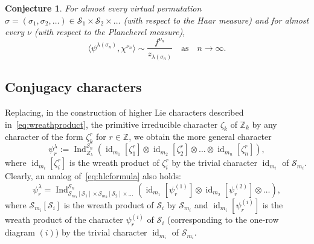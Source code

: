 \documentclass[12pt]%
{amsart}
\newcommand{\bbz}{\mathbb{Z}}
\renewcommand\S{{\mathcal S}}
\newcommand{\la}{{\lambda}}
\newcommand{\si}{{\sigma}}
\newcommand{\Ind}{\operatorname{Ind}}
\def\magenta#1{{\color{magenta}{#1}}}
\theoremstyle{plain}
\newtheorem{conjecture}[theorem]{Conjecture}
\theoremstyle{definition}
\theoremstyle{remark}
\newcommand{\id}{{\operatorname{id}}}
\newcommand{\todo}[1]{\vspace{5 mm}\par \noindent
	\marginpar{\textsc{ToDo}} \framebox{\begin{minipage}[c]{0.95
				\textwidth}
			#1 \end{minipage}}\vspace{5 mm}\par}
\begin{document}
\begin{conjecture}\label{conj:virtual}
    For almost every virtual permutation $\si =(\si_1,\si_2,\ldots) \in \S_1\times\S_2\times\ldots$ (with respect to the Haar measure) and for almost every $\nu$ (with respect to the Plancherel measure), 
    \[
        \langle \psi^{\la(\si_n)},\chi^{\nu_n} \rangle
        \sim \frac{f^{\nu_n}}{z_{\la(\si_n)}} 
        \quad \text{as} \quad n \to \infty .
    \]
\end{conjecture}



    


\subsection{Conjugacy characters}\label{sec:conjugacy}

Replacing, in the construction of higher Lie characters described in~\eqref{eq:wreathproduct}, the primitive irreducible character 
$\zeta_k$ of $\bbz_k$ by any character of the form $\zeta_k^r$ for $r \in \bbz$,
we obtain the more general character 
\[
    \psi^\la_r:=\Ind_{Z_\la}^{\S_n}\left(\id_{m_1}[\zeta_1^r]\otimes\id_{m_2}[\zeta_2^r]\otimes\ldots\otimes\id_{m_n}[\zeta_n^r]\right),
\]
where $\id_{m_i}[\zeta_i^r]$ is the wreath product of $\zeta_i^r$ by the trivial character $\id_{m_i}$ of $\S_{m_i}$. Clearly, an analog of~\eqref{eq:hlcformula} also holds:
\[
   \psi^\la_r =\Ind_{\S_{m_1}[\S_1]\times\S_{m_2}[\S_2]\times\ldots}^{\S_n}
\left(\id_{m_1}[\psi_r^{(1)}]\otimes\id_{m_2}[\psi_r^{(2)}]\otimes\ldots\right),
\]
where $\S_{m_i}[\S_i]$ is the wreath product of $\S_i$ by $\S_{m_i}$ and $\id_{m_i}[\psi_r^{(i)}]$ is the wreath product of the character $\psi_r^{(i)}$ of $\S_i$ 
(corresponding to the one-row diagram $(i)$)
by the trivial character $\id_{m_i}$ of $\S_{m_i}$.
\end{document}
